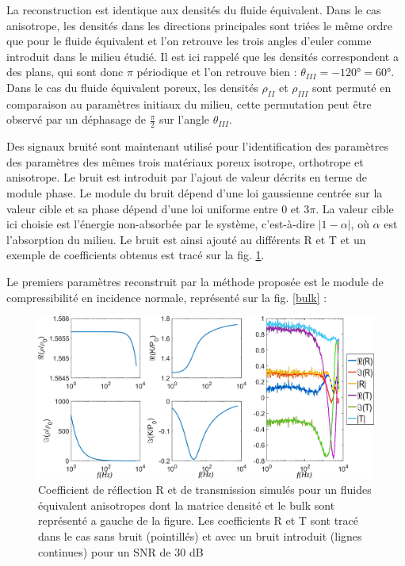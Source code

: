 \documentclass[twoside,openright]{report}
\begin{document}
    La reconstruction est identique aux densités du fluide équivalent. Dans le cas anisotrope, les densités dans les directions principales sont triées le même ordre que pour le fluide équivalent et l'on retrouve les trois angles d'euler comme introduit dans le milieu étudié. Il est ici rappelé que les densités correspondent a des plans, qui sont donc $\pi$ périodique et l'on retrouve bien : $\theta_{III}=-120°=60°$. Dans le cas du fluide équivalent poreux, les densités $\rho_{II}$ et $\rho_{III}$ sont permuté en comparaison au paramètres initiaux du milieu, cette permutation peut être observé par un déphasage de $\frac{\pi}{2}$ sur l'angle $\theta_{III}$.
    
    Des signaux bruité sont maintenant utilisé pour l'identification des paramètres des paramètres des mêmes trois matériaux poreux isotrope, orthotrope et anisotrope. Le bruit est introduit par l'ajout de valeur décrits en terme de module phase. Le module du bruit dépend d'une loi gaussienne centrée sur la valeur cible et sa phase dépend d'une loi uniforme entre 0 et $3\pi$. La valeur cible ici choisie est l'énergie non-absorbée par le système, c'est-à-dire $|1-\alpha|$, où $\alpha$ est l'absorption du milieu. Le bruit est ainsi ajouté au différents R et T et un exemple de coefficients obtenus est tracé sur la fig. \ref{RT_noise}. 
    
    Le premiers paramètres reconstruit par la méthode proposée est le module de compressibilité en incidence normale, représenté sur la fig. \ref{bulk} :
    
    \begin{figure}[ht!]
        \centering
        \includegraphics[scale=0.45]{RT_noise.pdf}
        \caption{Coefficient de réflection R et de transmission simulés pour un fluides équivalent anisotropes dont la matrice densité et le bulk sont représenté a gauche de la figure. Les coefficients R et T sont tracé dans le cas sans bruit (pointillés) et avec un bruit introduit (lignes continues) pour un SNR de 30 dB}
        \label{RT_noise}
    \end{figure}
    
\end{document}
